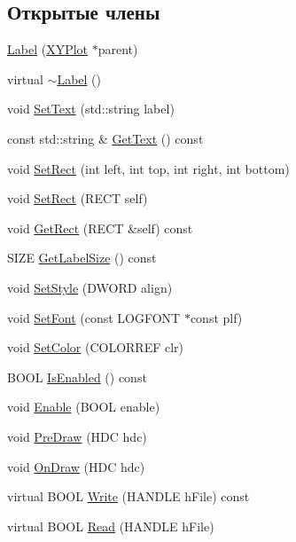 \subsection*{Открытые члены}
\begin{DoxyCompactItemize}
\item 
\hyperlink{class_label_ac3c18467d3dbf6f94e94b47c78d4b3c3}{Label} (\hyperlink{class_x_y_plot}{X\-Y\-Plot} $\ast$parent)
\item 
virtual \hyperlink{class_label_a39e1167a9b5827afd888780973d88894}{$\sim$\-Label} ()
\item 
void \hyperlink{class_label_acd24195d832566251e28855717a745be}{Set\-Text} (std\-::string label)
\item 
const std\-::string \& \hyperlink{class_label_aa0d783198414ad2c9a17b7fecfd19581}{Get\-Text} () const 
\item 
void \hyperlink{class_label_a327e98e659b00c708cc41154e65c5f2e}{Set\-Rect} (int left, int top, int right, int bottom)
\item 
void \hyperlink{class_label_a7dd76b7012e10269bb70ebae65c19c20}{Set\-Rect} (R\-E\-C\-T self)
\item 
void \hyperlink{class_label_a585867db26f2a3513cba06fea5fdccff}{Get\-Rect} (R\-E\-C\-T \&self) const 
\item 
S\-I\-Z\-E \hyperlink{class_label_a1c0c60f5aaffb61c7b69e22d3116a305}{Get\-Label\-Size} () const 
\item 
void \hyperlink{class_label_a3d832e782c6821b020fa6a6c3f90b298}{Set\-Style} (D\-W\-O\-R\-D align)
\item 
void \hyperlink{class_label_a2d281ba0d879c5e80dd498b590fde116}{Set\-Font} (const L\-O\-G\-F\-O\-N\-T $\ast$const plf)
\item 
void \hyperlink{class_label_ab35a831ca6da894e091ec422531b819e}{Set\-Color} (C\-O\-L\-O\-R\-R\-E\-F clr)
\item 
B\-O\-O\-L \hyperlink{class_label_af89bd0391480b31547b1793da49cc9eb}{Is\-Enabled} () const 
\item 
void \hyperlink{class_label_a323ad67434f656e25a6e2aa521f9f65f}{Enable} (B\-O\-O\-L enable)
\item 
void \hyperlink{class_label_a39a701c810b83e48ecc6be2ab4a66a19}{Pre\-Draw} (H\-D\-C hdc)
\item 
void \hyperlink{class_label_aa5bdf8574236283b0e0329c5c366cf2f}{On\-Draw} (H\-D\-C hdc)
\item 
virtual B\-O\-O\-L \hyperlink{class_label_a244a940c2d9301bd6bd2abcb2ef9af05}{Write} (H\-A\-N\-D\-L\-E h\-File) const 
\item 
virtual B\-O\-O\-L \hyperlink{class_label_a491dcc38695f69dd135fba56cfdeb3cf}{Read} (H\-A\-N\-D\-L\-E h\-File)
\end{DoxyCompactItemize}
